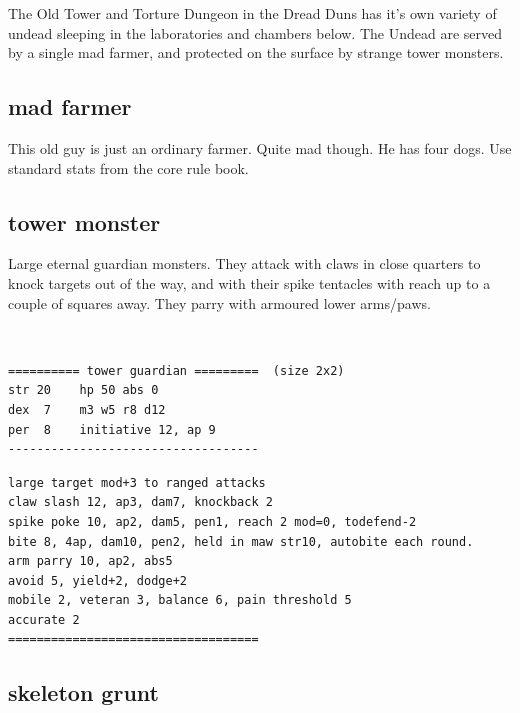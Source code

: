 \raggedbottom

The Old Tower and Torture Dungeon in the Dread Duns has it's own variety of undead sleeping in the laboratories and chambers below. The Undead are served by a single mad farmer, and protected on the surface by strange tower monsters.


\subsection*{mad farmer}

This old guy is just an ordinary farmer. Quite mad though. He has four dogs. Use standard stats from the core rule book.


\goodbreak 
\subsection*{tower monster}
\label{towermonster}

Large eternal guardian monsters. They attack with claws in close quarters to knock targets out of the way, and with their spike tentacles with reach up to a couple of squares away. They parry with armoured lower arms/paws. 

\

\small \begin{samepage} \begin{verbatim}
========== tower guardian =========  (size 2x2)
str 20    hp 50 abs 0
dex  7    m3 w5 r8 d12
per  8    initiative 12, ap 9
-----------------------------------
\end{verbatim} \end{samepage} \goodbreak \begin{samepage} \begin{verbatim}
large target mod+3 to ranged attacks
claw slash 12, ap3, dam7, knockback 2
spike poke 10, ap2, dam5, pen1, reach 2 mod=0, todefend-2
bite 8, 4ap, dam10, pen2, held in maw str10, autobite each round.
arm parry 10, ap2, abs5
avoid 5, yield+2, dodge+2
mobile 2, veteran 3, balance 6, pain threshold 5
accurate 2
===================================
\end{verbatim} \end{samepage} \normalsize



\goodbreak 
\subsection*{skeleton grunt}
\label{skeletongrunt}


